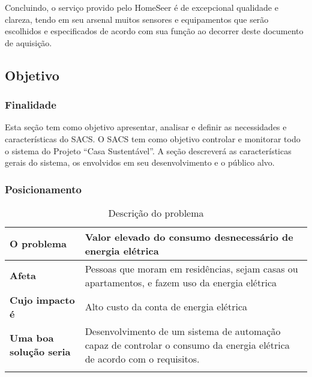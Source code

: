 	Concluindo, o serviço provido pelo HomeSeer é de excepcional qualidade e clareza, tendo em seu arsenal muitos sensores e equipamentos que serão escolhidos e especificados de acordo com sua função ao decorrer deste documento de aquisição.


\subsection{Objetivo}
\label{subsec:objetivo}

\subsubsection{Finalidade}

	Esta seção tem como objetivo apresentar, analisar e definir as necessidades e características do SACS. O
	SACS tem como objetivo controlar e monitorar todo o sistema do Projeto “Casa Sustentável”. A seção
	descreverá as características gerais do sistema, os envolvidos em seu desenvolvimento e o público alvo.

\subsubsection{Posicionamento}

\begin{longtable}{|l|m{7cm}|}
	\hline \textbf{O problema} & Valor elevado do consumo desnecessário de energia elétrica\\
	\hline \textbf{Afeta} & Pessoas que moram em residências, sejam casas ou apartamentos, e fazem uso da energia
	elétrica\\
	\hline \textbf{Cujo impacto é} & Alto custo da conta de energia elétrica\\
	\hline \textbf{Uma boa solução seria} & Desenvolvimento de um sistema de automação capaz de controlar o consumo
	da energia elétrica de acordo com o requisitos.\\
	\hline
\caption{Descrição do problema}
\label{Descrição_do_problema}
\end{longtable}


